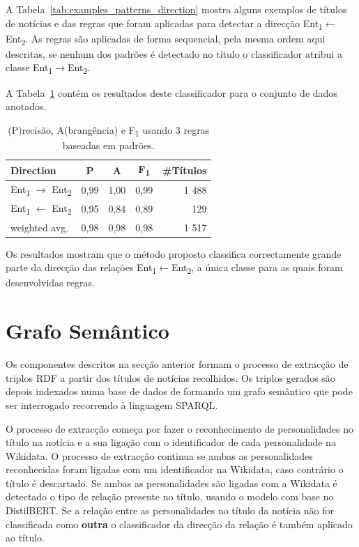 \documentclass[a4paper, twocolumn, 11pt, twoside]{article}
\begin{document}
A Tabela~\ref{tab:examples_patterns_direction} mostra alguns exemplos de títulos de notícias e das regras que foram aplicadas para detectar a direcção Ent\textsubscript{1}$\leftarrow$Ent\textsubscript{2}. As regras são aplicadas de forma sequencial, pela mesma ordem aqui descritas, se nenhum dos padrões é detectado no título o classificador atribui a classe {Ent\textsubscript{1}$\rightarrow$Ent\textsubscript{2}}.

A Tabela~\ref{tab:direction_clf_results} contém os resultados deste classificador para o conjunto de dados anotados.

\begin{table}[!h]
    \begin{center}
    \begin{tabular}{l cccr}
        {\bf Direction} & {\bf P} & {\bf A} & {\bf F\textsubscript{1}} & {\bf \#Títulos} \\
        \hline
        \small{Ent\textsubscript{1} $\rightarrow$ Ent\textsubscript{2}} & 0,99  &  1,00  &  0,99  & 1 488 \\
		\small{Ent\textsubscript{1} $\leftarrow$ Ent\textsubscript{2}}  & 0,95  &  0,84  &  0,89  &   129  \\
		\hline
	    weighted avg.     &      0,98       & 0,98       & 0,98		&   1 517 \\
    \end{tabular}
	\caption{(P)recisão, A(brangência) e F\textsubscript{1} usando 3 regras baseadas em padrões.}
	\label{tab:direction_clf_results}
	\end{center}
\end{table}

Os resultados mostram que o método proposto classifica correctamente grande parte da direcção das relações Ent\textsubscript{1}$\leftarrow$Ent\textsubscript{2}, a única classe para as quais foram desenvolvidas regras.

\section{Grafo Semântico}
\label{sec:pipeline}

Os componentes descritos na secção anterior formam o processo de extracção de triplos RDF a partir dos títulos de notícias recolhidos. Os triplos gerados são depois indexados numa base de dados de formando um grafo semântico que pode ser interrogado recorrendo à linguagem SPARQL.

O processo de extracção começa por fazer o reconhecimento de personalidades no título na notícia e a sua ligação com o identificador de cada personalidade na Wikidata. O processo de extracção continua se ambas as personalidades reconhecidas foram ligadas com um identificador na Wikidata, caso contrário o título é descartado. Se ambas as personalidades são ligadas com a Wikidata é detectado o tipo de relação presente no título, usando o modelo com base no DistilBERT. Se a relação entre as personalidades no título da notícia não for classificada como \textbf{outra} o classificador da direcção da relação é também aplicado ao título. 
\end{document}
